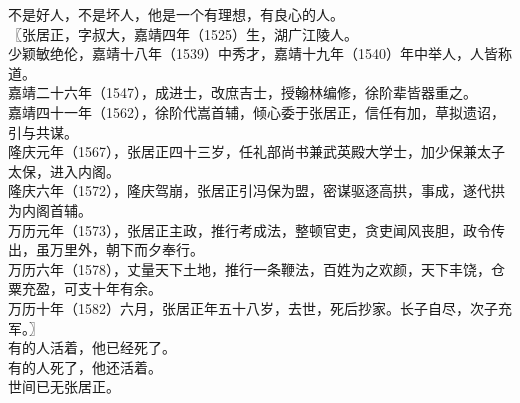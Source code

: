 \begin{multicols}{\theparacolNo}
不是好人，不是坏人，他是一个有理想，有良心的人。\\

〖张居正，字叔大，嘉靖四年（1525）生，湖广江陵人。\\

少颖敏绝伦，嘉靖十八年（1539）中秀才，嘉靖十九年（1540）年中举人，人皆称道。\\

嘉靖二十六年（1547），成进士，改庶吉士，授翰林编修，徐阶辈皆器重之。\\

嘉靖四十一年（1562），徐阶代嵩首辅，倾心委于张居正，信任有加，草拟遗诏，引与共谋。\\

隆庆元年（1567），张居正四十三岁，任礼部尚书兼武英殿大学士，加少保兼太子太保，进入内阁。\\

隆庆六年（1572），隆庆驾崩，张居正引冯保为盟，密谋驱逐高拱，事成，遂代拱为内阁首辅。\\

万历元年（1573），张居正主政，推行考成法，整顿官吏，贪吏闻风丧胆，政令传出，虽万里外，朝下而夕奉行。\\

万历六年（1578），丈量天下土地，推行一条鞭法，百姓为之欢颜，天下丰饶，仓粟充盈，可支十年有余。\\

万历十年（1582）六月，张居正年五十八岁，去世，死后抄家。长子自尽，次子充军。〗\\

有的人活着，他已经死了。\\

有的人死了，他还活着。\\

世间已无张居正。\\

\ifnum{}
	\end{multicols}
\fi
\newpage

